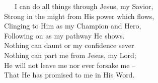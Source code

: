 \documentclass[
]{book}
\begin{document}
~~~I can do all things through Jesus, my Savior,\\
\hspace*{0.333em}\hspace*{0.333em}\hspace*{0.333em}Strong in the might from His power which flows,\\
\hspace*{0.333em}\hspace*{0.333em}\hspace*{0.333em}Clinging to Him as my Champion and Hero,\\
\hspace*{0.333em}\hspace*{0.333em}\hspace*{0.333em}Following on as my pathway He shows.\\
\hspace*{0.333em}\hspace*{0.333em}\hspace*{0.333em}Nothing can daunt or my confidence sever\\
\hspace*{0.333em}\hspace*{0.333em}\hspace*{0.333em}Nothing can part me from Jesus, my Lord;\\
\hspace*{0.333em}\hspace*{0.333em}\hspace*{0.333em}He will not leave me nor ever forsake me --\\
\hspace*{0.333em}\hspace*{0.333em}\hspace*{0.333em}That He has promised to me in His Word.
\end{document}
